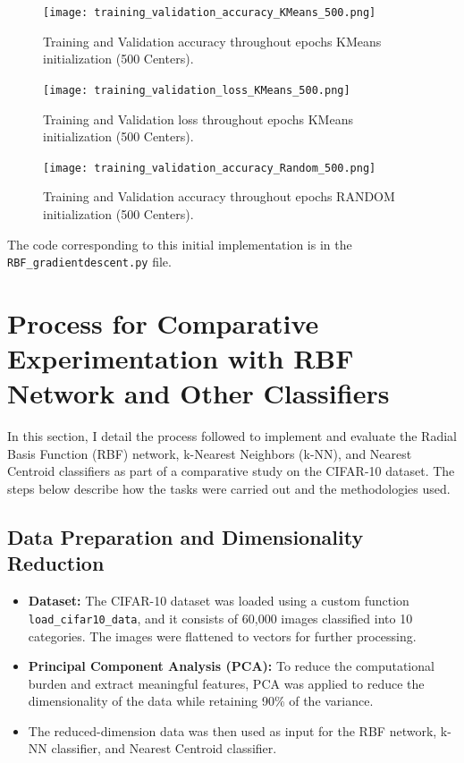 \documentclass[lettersize,journal]{IEEEtran}
\begin{document}
\begin{figure}[H]
    \centering
    \texttt{[image: training\_validation\_accuracy\_KMeans\_500.png]}
    \caption{Training and Validation accuracy throughout epochs KMeans initialization (500 Centers).}
    \label{fig:TR500Centers}
\end{figure}

\begin{figure}[H]
    \centering
    \texttt{[image: training\_validation\_loss\_KMeans\_500.png]}
    \caption{Training and Validation loss throughout epochs KMeans initialization (500 Centers).}
    \label{fig:TR500Centersloss}
\end{figure}

\begin{figure}[H]
    \centering
    \texttt{[image: training\_validation\_accuracy\_Random\_500.png]}
    \caption{Training and Validation accuracy throughout epochs RANDOM initialization (500 Centers).}
    \label{fig:TR500RandCenters}
\end{figure}

The code corresponding to this initial implementation is in the \texttt{RBF\_gradientdescent.py} file.

\section{\textbf{Process for Comparative Experimentation with RBF Network and Other Classifiers}}

In this section, I detail the process followed to implement and evaluate the Radial Basis Function (RBF) network, k-Nearest Neighbors (k-NN), and Nearest Centroid classifiers as part of a comparative study on the CIFAR-10 dataset. The steps below describe how the tasks were carried out and the methodologies used.

\subsection{\textbf{Data Preparation and Dimensionality Reduction}}
\begin{itemize}
    \item \textbf{Dataset:} The CIFAR-10 dataset was loaded using a custom function \texttt{load\_cifar10\_data}, and it consists of 60,000 images classified into 10 categories. The images were flattened to vectors for further processing.
    \item \textbf{Principal Component Analysis (PCA):} To reduce the computational burden and extract meaningful features, PCA was applied to reduce the dimensionality of the data while retaining 90\% of the variance.
    \item The reduced-dimension data was then used as input for the RBF network, k-NN classifier, and Nearest Centroid classifier.
\end{itemize}
\end{document}
